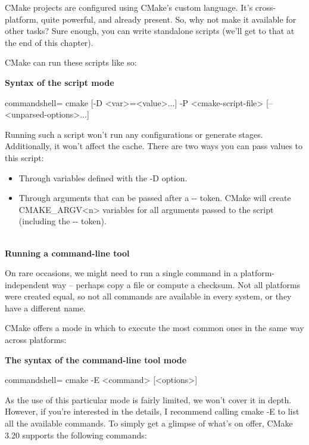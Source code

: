 CMake projects are configured using CMake's custom language. It's cross-platform, quite powerful, and already present. So, why not make it available for other tasks? Sure enough, you can write standalone scripts (we'll get to that at the end of this chapter).

CMake can run these scripts like so:

\textbf{Syntax of the script mode}

\begin{tcblisting}{commandshell={}}
cmake [{-D <var>=<value>}...] -P <cmake-script-file>
      [-- <unparsed-options>...]
\end{tcblisting}

Running such a script won't run any configurations or generate stages. Additionally, it won't affect the cache. There are two ways you can pass values to this script:

\begin{itemize}
\item 
Through variables defined with the -D option.

\item 
Through arguments that can be passed after a -{}- token. CMake will create CMAKE\_ARGV<n> variables for all arguments passed to the script (including the -{}- token).
\end{itemize}

\hspace*{\fill} \\ %
\noindent
\textbf{Running a command-line tool}

On rare occasions, we might need to run a single command in a platform-independent way – perhaps copy a file or compute a checksum. Not all platforms were created equal, so not all commands are available in every system, or they have a different name.

CMake offers a mode in which to execute the most common ones in the same way across platforms:

\textbf{The syntax of the command-line tool mode}

\begin{tcblisting}{commandshell={}}
cmake -E <command> [<options>]
\end{tcblisting}

As the use of this particular mode is fairly limited, we won't cover it in depth. However, if you're interested in the details, I recommend calling cmake -E to list all the available commands. To simply get a glimpse of what's on offer, CMake 3.20 supports the following commands:

